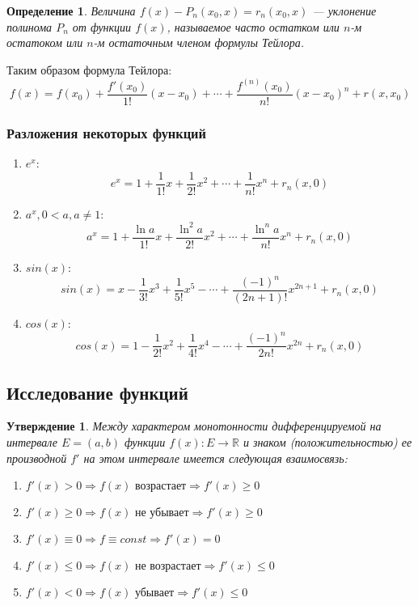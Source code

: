 \documentclass[12pt]{report}
\theoremstyle{plain}
\newtheorem{definition}[theorem]{Определение}
\newtheorem{statement}[theorem]{Утверждение}
\newcommand{\R}{\mathbb R}
\begin{document}
\begin{definition}
Величина $f(x) - P_n(x_0, x) = r_n(x_0, x)$ --- уклонение
полинома $P_n$ от функции $f(x)$, называемое часто остатком
или $n$-м остатоком или $n$-м остаточным членом формулы Тейлора.
\end{definition}

Таким образом формула Тейлора:
$$
f(x) = f(x_0) + \dfrac{f'(x_0)}{1!}(x - x_0)+ \cdots + 
\dfrac{f^{(n)}(x_0)}{n!} (x - x_0)^n + r(x, x_0)
$$

\subsubsection{Разложения некоторых функций}
\begin{enumerate}
\item $e^x$:
  $$
    e^x = 1 + \dfrac{1}{1!} x + \dfrac{1}{2!} x^2 + \cdots + \dfrac{1}{n!} x^n + r_n(x, 0)
  $$
\item $a^x, 0 < a, a \ne 1$:
  $$
    a^x = 1 + \dfrac{\ln a}{1!} x + \dfrac{\ln^2 a}{2!} x^2 + \cdots + \dfrac{\ln^n a}{n!} x^n + r_n(x, 0)
  $$
\item $sin(x)$:
  $$
    sin(x) = x - \dfrac{1}{3!} x^3 + \dfrac{1}{5!} x^5 - \cdots + \dfrac{(-1)^n}{(2n + 1)!} x^{2n+1} + r_n(x, 0)
  $$
\item $cos(x)$:
  $$
    cos(x) = 1 - \dfrac{1}{2!} x^2 + \dfrac{1}{4!} x^4 - \cdots + \dfrac{(-1)^n}{2n!} x^{2n} + r_n(x, 0)
  $$
\end{enumerate}

\subsection{Исследование функций}
\begin{statement}
Между характером монотонности дифференцируемой на интервале $E = (a, b)$
функции $f(x): E \rightarrow \R$ и знаком (положительностью) ее производной
$f'$ на этом интервале имеется следующая взаимосвязь:
\begin{enumerate}
\item $f'(x) > 0 \Rightarrow f(x) \text{ возрастает} \Rightarrow f'(x) \ge 0$
\item $f'(x) \ge 0 \Rightarrow f(x) \text{ не убывает} \Rightarrow f'(x) \ge 0$
\item $f'(x) \equiv 0 \Rightarrow f \equiv const \Rightarrow f'(x) = 0$
\item $f'(x) \le 0 \Rightarrow f(x) \text{ не возрастает} \Rightarrow f'(x) \le 0$
\item $f'(x) < 0 \Rightarrow f(x) \text{ убывает} \Rightarrow f'(x) \le 0$
\end{enumerate}
\end{statement}
\end{document}

